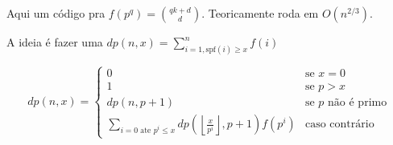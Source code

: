 Aqui um código pra $f(p^q) = \binom{qk + d}{d}$. Teoricamente roda em $O(n^{2/3})$.

A ideia é fazer uma $dp(n, x) = \sum\limits_{i=1, \text{spf}(i) \geq x}^n f(i)$

 $$
    dp(n, x) =
    \begin{cases}
    0 & \text{se } x = 0 \\
    1 & \text{se } p > x \\
    dp(n, p + 1) & \text{se } p \text{ não é primo} \\
    \sum\limits_{i=0 \text{ ate } p^i \leq x} dp\left(\left\lfloor \frac{x}{p^i}\right\rfloor, p + 1\right) f(p^i) & \text{caso contrário}
    \end{cases}
$$

